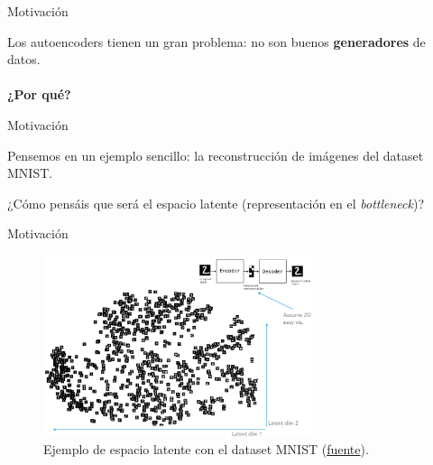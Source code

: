 \begin{frame}{Motivación}

Los autoencoders tienen un gran problema: no son buenos \textbf{generadores} de datos.
\\
\\
\centering\textbf{¿Por qué?}
\end{frame}

\begin{frame}{Motivación}

Pensemos en un ejemplo sencillo: la reconstrucción de imágenes del dataset MNIST.

¿Cómo pensáis que será el espacio latente (representación en el \textit{bottleneck})?

\end{frame}

\begin{frame}{Motivación}

\begin{figure}
    \centering
    \includegraphics[width=0.7\textwidth]{Slides/figures/02_Metodos_Generativos/ae-latent-space.png}
    \caption{Ejemplo de espacio latente con el dataset MNIST (\href{https://indico.ictp.it/event/8674/session/155/contribution/1121/material/slides/0.pdf}{fuente}).}
    \label{fig:enter-label}
\end{figure}

\end{frame}

